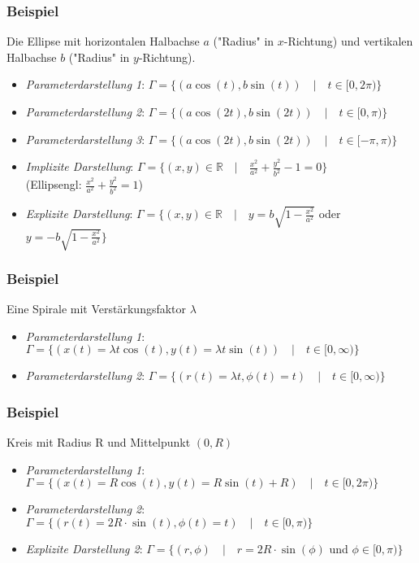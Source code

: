 \documentclass[11pt]{article} %
\begin{document}
\subsubsection{Beispiel}
Die Ellipse mit horizontalen Halbachse $a$ ("Radius" in $x$-Richtung) und vertikalen Halbachse $b$ ("Radius" in $y$-Richtung).
\begin{itemize}
\item \emph{Parameterdarstellung 1}: $\Gamma = \{(a\cos (t),b \sin (t)) \quad | \quad t \in [0,2\pi) \}$
\item \emph{Parameterdarstellung 2}: $\Gamma = \{(a\cos (2t), b \sin (2t)) \quad | \quad t \in [0,\pi) \}$
\item \emph{Parameterdarstellung 3}: $\Gamma = \{(a\cos (2t), b \sin (2t)) \quad | \quad t \in [-\pi,\pi) \}$
\item \emph{Implizite Darstellung}: $\Gamma = \{(x,y) \in \mathbb{R} \quad | \quad \frac{x^2}{a^2} + \frac{y^2}{b^2} -1=0 \}$\\ (Ellipsengl: $\frac{x^2}{a^2} + \frac{y^2}{b^2} =1$)
\item \emph{Explizite Darstellung}: $\Gamma = \{(x,y) \in \mathbb{R} \quad | \quad y = b\sqrt{ 1- \frac{x^2}{a^2}}$ oder $y = -b\sqrt{ 1- \frac{x^2}{a^2}} \}$
\end{itemize}

\subsubsection{Beispiel}
Eine Spirale mit Verstärkungsfaktor $\lambda$
\begin{itemize}
\item \emph{Parameterdarstellung 1}: $\Gamma = \{(x(t) = \lambda  t\cos (t), y(t) = \lambda t \sin (t)) \quad | \quad t \in [0,\infty) \}$
\item \emph{Parameterdarstellung 2}: $\Gamma = \{(r(t) = \lambda  t,\phi(t)= t) \quad | \quad t \in [0,\infty) \}$
\end{itemize}

\subsubsection{Beispiel}
Kreis mit Radius R und Mittelpunkt $(0,R)$
\begin{itemize}
\item \emph{Parameterdarstellung 1}: $\Gamma = \{(x(t) = R\cos (t), y(t) = R\sin (t) + R) \quad | \quad t \in [0,2\pi) \}$
\item \emph{Parameterdarstellung 2}: $\Gamma = \{(r(t) = 2R\cdot \sin(t),\phi(t)= t) \quad | \quad t \in [0,\pi) \}$
\item \emph{Explizite Darstellung 2}: $\Gamma = \{(r,\phi) \quad | \quad r = 2R\cdot \sin(\phi) $ und $ \phi \in [0,\pi)\}$
\end{itemize}
\end{document}
